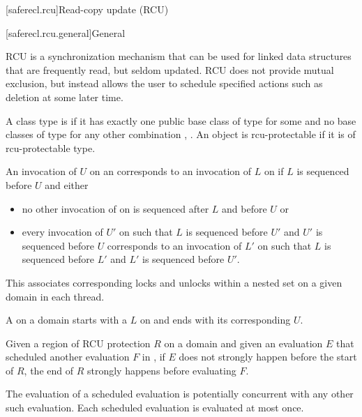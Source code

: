 
[saferecl.rcu]{Read-copy update (RCU)}

[saferecl.rcu.general]{General}

RCU is a synchronization mechanism that can be used for linked data
structures that are frequently read, but seldom updated. RCU does
not provide mutual exclusion, but instead allows the user to schedule
specified actions such as deletion at some later time.

A class type  is  if it has exactly one
public base class of type  for some 
and no base classes of type  for any other
combination , . An object is rcu-protectable if it is
of rcu-protectable type.

An invocation of  $U$ on an  corresponds
to an invocation of  $L$ on  if $L$ is
sequenced before $U$ and either

\begin{itemize}
\item	no other invocation of  on  is sequenced
	after $L$ and before $U$ or
\item	every invocation of  $U'$ on  such
	that $L$ is sequenced before $U'$ and $U'$
	is sequenced before $U$ corresponds to an invocation of
	 $L'$ on  such that $L$ is sequenced
	before $L'$ and $L'$ is sequenced before $U'$.
\end{itemize}
\begin{note}
This associates corresponding locks and unlocks within a nested set
on a given domain in each thread.\end{note}

A  on a domain  starts
with a  $L$ on  and ends with its corresponding
 $U$.

Given a region of RCU protection $R$ on a domain 
and given an evaluation $E$ that scheduled another evaluation
$F$ in , if $E$ does not strongly happen before
the start of $R$, the end of $R$ strongly happens before
evaluating $F$.

The evaluation of a scheduled evaluation is potentially concurrent with
any other such evaluation. Each scheduled evaluation is evaluated at
most once.

